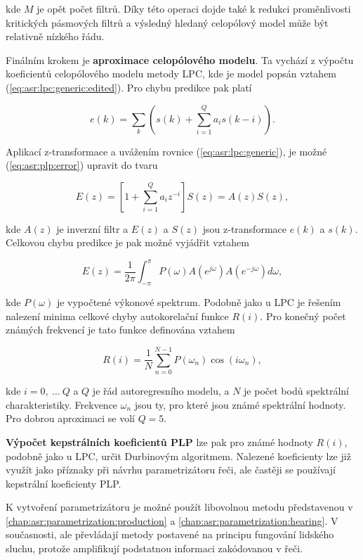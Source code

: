 \noindent kde $M$ je opět počet filtrů. Díky této operaci dojde také k redukci proměnlivosti  kritických pásmových filtrů a výsledný hledaný celopólový model může být relativně nízkého řádu.

Finálním krokem je \textbf{aproximace celopólového modelu}. Ta vychází z výpočtu koeficientů celopólového modelu metody LPC, kde je model popsán vztahem (\ref{eq:asr:lpc:generic:edited}). Pro chybu predikce pak platí

\begin{equation}
  e\left(k\right) = \sum_{k} \left(s\left(k\right) + \sum_{i=1}^{Q} a_i s\left(k - i\right)\right).
  \label{eq:asr:plp:error}
\end{equation}

\noindent Aplikací z-transformace a uvážením rovnice (\ref{eq:asr:lpc:generic}), je možné (\ref{eq:asr:plp:error}) upravit do tvaru

\begin{equation}
  E\left(z\right) = \left[1 + \sum_{i=1}^{Q} a_i z^{-i}\right] S\left(z\right) = A\left(z\right)S\left(z\right),
  \label{eq:asr:plp:error:transform}
\end{equation}

\noindent kde $A\left(z\right)$ je inverzní filtr a $E\left(z\right)$ a $S\left(z\right)$ jsou z-transformace $e\left(k\right)$ a $s\left(k\right)$. Celkovou chybu predikce je pak možné vyjádřit vztahem

\begin{equation}
  E\left(z\right) = \frac{1}{2\pi} \int_{-\pi}^{\pi} P\left(\omega\right) A\left(e^{j\omega}\right) A\left(e^{-j\omega}\right)d\omega,
  \label{eq:asr:plp:error:final}
\end{equation}

\noindent kde $P\left(\omega\right)$ je vypočtené výkonové spektrum. Podobně jako u LPC je řešením nalezení minima celkové chyby autokorelační funkce $R\left(i\right)$. Pro konečný počet známých frekvencí je tato funkce definována vztahem

\begin{equation}
  R\left(i\right) = \frac{1}{N} \sum_{n=0}^{N-1} P\left(\omega_n\right) \cos\left(i\omega_n\right),
  \label{eq:asr:plp:error:solution}
\end{equation}

\noindent kde $i = 0,\ \dots\ Q$ a $Q$ je řád autoregresního modelu, a $N$ je počet bodů spektrální charakteristiky. Frekvence $\omega_n$ jsou ty, pro které jsou známé spektrální hodnoty. Pro dobrou aproximaci se volí $Q = 5$.

\textbf{Výpočet kepstrálních koeficientů PLP} lze pak pro známé hodnoty $R\left(i\right)$, podobně jako u LPC, určit Durbinovým algoritmem. Nalezené koeficienty lze již využít jako příznaky při návrhu parametrizátoru řeči, ale častěji se používají kepstrální koeficienty PLP. \cite{Holmes2001}

K vytvoření parametrizátoru je možné použít libovolnou metodu představenou v \ref{chap:asr:parametrization:production} a \ref{chap:asr:parametrization:hearing}. V současnosti, ale převládají metody postavené na principu fungování lidského sluchu, protože amplifikují podstatnou informaci zakódovanou v řeči.
